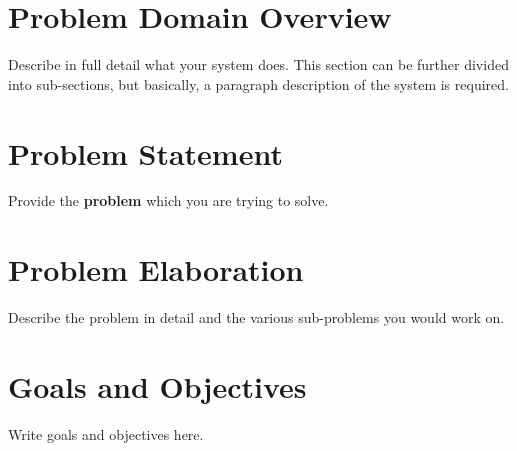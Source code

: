 \documentclass{FastFyp}
\begin{document}
\section{Problem Domain Overview}
Describe in full detail what your system does. This section can be further divided into sub-sections, but basically, a paragraph description of the system is required.
\section{Problem Statement}
Provide the \textbf{problem} which you are trying to solve. 
\section{Problem Elaboration}
Describe the problem in detail and the various sub-problems you would work on.
\section{Goals and Objectives}
Write goals and objectives here.
\end{document}
